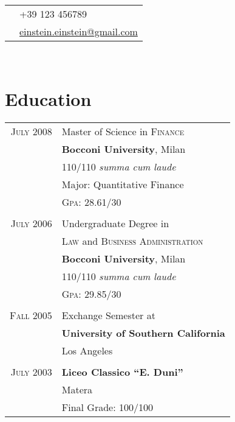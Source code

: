 \documentclass[10pt]{article}
\begin{document}
{\begin{minipage}[t]{0.5\textwidth}
\end{minipage} %
\hfill
\begin{minipage}[t]{0.44\textwidth} %
	
	\vspace{0pt} %
	
\colorbox{shade}{\textcolor{text1}{
	\begin{tabular}{c|p{7cm}}
		\raisebox{-3pt}{\Phone}  		&+39 123 456789\\
		\raisebox{-3pt}{\Envelope} 	&\href{mailto:albert.einstein@gmail.com}
								{einstein.einstein@gmail.com}
	\end{tabular}
	}
}\\[10pt]

\section{Education}

\begin{tabular}{rl}
 	
	\textsc{July} 2008 & Master of Science in \textsc{Finance}\\
	 & \textbf{Bocconi University}, Milan\\
	 & 110/110 \small\emph{summa cum laude}\\
	 & Major: Quantitative Finance\\
	 &\normalsize \textsc{Gpa}: 28.61/30\\
	 &\\
	\textsc{July} 2006 & Undergraduate Degree in\\
	 & \textsc{Law} and \textsc{Business Administration}\\
	 & \textbf{Bocconi University}, Milan\\
	 &110/110 \small\emph{summa cum laude}\\
	 &\normalsize \textsc{Gpa}: 29.85/30\\
	 &\\
	\textsc{Fall} 2005& Exchange Semester at \\
	& \textbf{University of Southern California} \\
	&Los Angeles\\
	&\\
	\textsc{July} 2003& \textbf{Liceo Classico ``E. Duni''}\\
	& Matera\\
	& Final Grade: 100/100


\end{tabular}
\end{minipage}}
\end{document}
